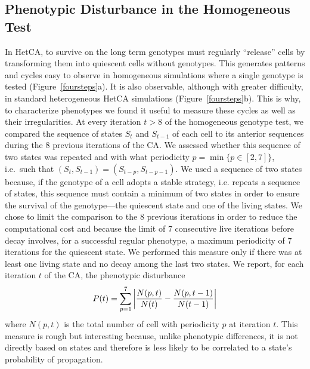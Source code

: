 \subsection{Phenotypic Disturbance in the Homogeneous Test} 
In HetCA, to survive on the long term genotypes must regularly ``release'' cells by transforming them into quiescent cells without genotypes. This generates patterns and cycles easy to observe in homogeneous simulations where a single genotype is tested (Figure~\ref{foursteps}a). It is also observable, although with greater difficulty, in standard heterogeneous HetCA simulations (Figure~\ref{foursteps}b). This is why, to characterize phenotypes we found it useful to measure these cycles as well as their irregularities. At every iteration $t > 8$ of the homogeneous genotype test, we compared the sequence of states $S_t$ and $S_{t-1}$ of each cell to its anterior sequences during the 8 previous iterations of the CA. We assessed whether this sequence of two states was repeated and with what periodicity $p=\min\{p \in [2,7]\}$, i.e.~such that $(S_t,S_{t-1}) = (S_{t-p},S_{t-p-1})$. We used a sequence of two states because, if the genotype of a cell adopts a stable strategy, i.e. repeats a sequence of states, this sequence must contain a minimum of two states in order to ensure the survival of the genotype---the quiescent state and one of the living states. We chose to limit the comparison to the 8 previous iterations in order to reduce the computational cost and because the limit of 7 consecutive live iterations before decay involves, for a successful regular phenotype, a maximum periodicity of 7 iterations for the quiescent state. We performed this measure only if there was at least one living state and no decay among the last two states. We report, for each iteration $t$ of the CA, the phenotypic disturbance
%
$$P(t) = \sum_{p=1}^7 \left| \frac{N(p,t)}{N(t)}-\frac{N(p,t-1)}{N(t-1)}\right|$$
%
where $N(p,t)$ is the total number of cell with periodicity $p$ at iteration $t$. This measure is rough but interesting because, unlike phenotypic differences, it is not directly based on states and therefore is less likely to be correlated to a state’s probability of propagation.
 
